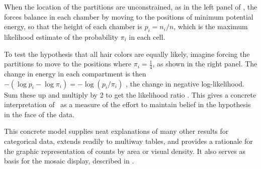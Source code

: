 When the location of the partitions are unconstrained, as in the
left panel of , the forces balance in each chamber
by moving to the positions of minimum potential energy, so that
the height of each chamber is $p_i = n_i / n$, which is the maximum likelihood
estimate of the probability $\pi_i$ in each cell.

To test the hypothesis that all hair colors are equally likely,
imagine forcing the partitions to move to the positions where
$\pi_i = \frac{1}{4}$, as shown in the right panel.
The change in energy in each compartment is then 
$- ( \log  p_i - \log  \pi_i ) = - \log ( p_i / \pi_i )$ , 
the change in negative log-likelihood. Sum these up and multiply by 2 to get the likelihood ratio \GSQ. This gives a concrete interpretation of \GSQ\ as a measure of the effort to maintain belief in the hypothesis in the face of the data. 

This concrete model supplies neat explanations of many other results for categorical data, extends readily to multiway tables, and provides a rationale for the graphic representation of counts by area or visual density.
It also serves as basis for the mosaic display, described in
.
